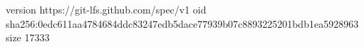 version https://git-lfs.github.com/spec/v1
oid sha256:0edc611aa4784684ddc83247edb5dace77939b07c8893225201bdb1ea5928963
size 17333
